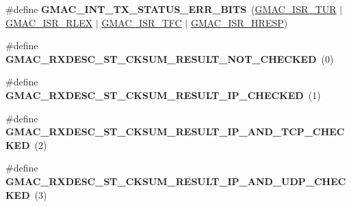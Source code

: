 \begin{DoxyCompactItemize}
\item 
\mbox{\label{group__gmac__defines_gacb2479a3795740ee02d651bf66e39472}} 
\#define {\bfseries G\+M\+A\+C\+\_\+\+I\+N\+T\+\_\+\+T\+X\+\_\+\+S\+T\+A\+T\+U\+S\+\_\+\+E\+R\+R\+\_\+\+B\+I\+TS}~(\mbox{\hyperlink{group__SAMV71__GMAC_ga948482563c04075f65e7a673d3f711b0}{G\+M\+A\+C\+\_\+\+I\+S\+R\+\_\+\+T\+UR}} $\vert$ \mbox{\hyperlink{group__SAMV71__GMAC_gaac419db37253ffbfe888d1216539c54f}{G\+M\+A\+C\+\_\+\+I\+S\+R\+\_\+\+R\+L\+EX}} $\vert$ \mbox{\hyperlink{group__SAMV71__GMAC_ga67779dcadc46634f3931f53a58b5a00c}{G\+M\+A\+C\+\_\+\+I\+S\+R\+\_\+\+T\+FC}} $\vert$ \mbox{\hyperlink{group__SAMV71__GMAC_ga24c8298ef226ae0f7f1c854905648273}{G\+M\+A\+C\+\_\+\+I\+S\+R\+\_\+\+H\+R\+E\+SP}})
\item 
\mbox{\label{group__gmac__defines_gaea849cd3e7b74ce87622290ffdd2f19f}} 
\#define {\bfseries G\+M\+A\+C\+\_\+\+R\+X\+D\+E\+S\+C\+\_\+\+S\+T\+\_\+\+C\+K\+S\+U\+M\+\_\+\+R\+E\+S\+U\+L\+T\+\_\+\+N\+O\+T\+\_\+\+C\+H\+E\+C\+K\+ED}~(0)
\item 
\mbox{\label{group__gmac__defines_gaaebec34ad1dca24a7546ded951eec921}} 
\#define {\bfseries G\+M\+A\+C\+\_\+\+R\+X\+D\+E\+S\+C\+\_\+\+S\+T\+\_\+\+C\+K\+S\+U\+M\+\_\+\+R\+E\+S\+U\+L\+T\+\_\+\+I\+P\+\_\+\+C\+H\+E\+C\+K\+ED}~(1)
\item 
\mbox{\label{group__gmac__defines_gafc2729a13dc10bd1c28c01d854471d75}} 
\#define {\bfseries G\+M\+A\+C\+\_\+\+R\+X\+D\+E\+S\+C\+\_\+\+S\+T\+\_\+\+C\+K\+S\+U\+M\+\_\+\+R\+E\+S\+U\+L\+T\+\_\+\+I\+P\+\_\+\+A\+N\+D\+\_\+\+T\+C\+P\+\_\+\+C\+H\+E\+C\+K\+ED}~(2)
\item 
\mbox{\label{group__gmac__defines_ga2d558bb4ad80b940bc9fa98753f2af4c}} 
\#define {\bfseries G\+M\+A\+C\+\_\+\+R\+X\+D\+E\+S\+C\+\_\+\+S\+T\+\_\+\+C\+K\+S\+U\+M\+\_\+\+R\+E\+S\+U\+L\+T\+\_\+\+I\+P\+\_\+\+A\+N\+D\+\_\+\+U\+D\+P\+\_\+\+C\+H\+E\+C\+K\+ED}~(3)
\end{DoxyCompactItemize}
